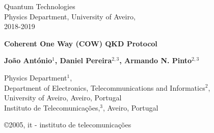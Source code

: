 \documentclass[5pt]{article}
\newcommand{\br}[1]{{\textbf{\color{itred} #1}}}%
\begin{document}
\begin{titlepage}  

\color{itblue} \sffamily \noindent \small
\hspace*{1cm}  Quantum Technologies\\
\hspace*{1cm}  Physics Department, University of Aveiro,\\ %
%
\hspace*{1cm}  2018-2019\\ 

\vspace*{1cm}
\begin{center}
    \color{black} \sffamily \noindent \Large
    \br{Coherent One Way (COW) QKD Protocol \\}
\end{center}
\vspace{6mm}
\begin{center}
    \color{black}
    \textbf{João António$^1$, Daniel Pereira$^{2,3}$, Armando N. Pinto$^{2,3}$\\}
    {}
\end{center}

\vspace{0.0mm}
\scriptsize
\begin{center}
Physics Department$^1$,\\
Department of Electronics, Telecommunications and Informatics$^2$,\\
University of Aveiro, Aveiro, Portugal\\
Instituto de Telecomunica\c{c}\~{o}es,$^3$, Aveiro, Portugal\\
\end{center}

\vspace{1.0cm}
\hspace*{13.2cm}\tiny \copyright 2005, it - instituto de telecomunica\c{c}\~{o}es\hfill

\end{titlepage}


\renewcommand{\headsep}{-25pt}
\end{document}
